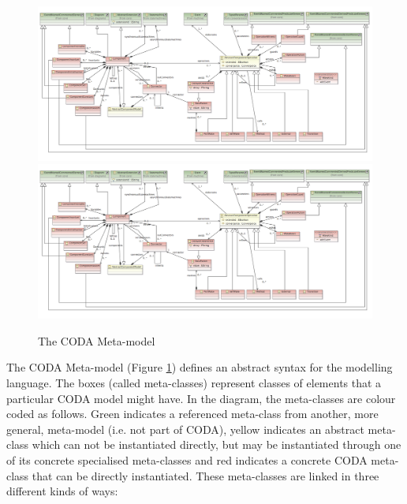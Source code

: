 \begin{figure}[!htbp]
  \centering
  \ifplastex
  \includegraphics[width=1024]{figures/image1.png}
  \else
  \includegraphics[width=1.0\textwidth]{figures/image1.png}
  \fi
  \caption{The CODA Meta-model}
  \label{fig:TheCodaMetamodel}
\end{figure}



The CODA Meta-model (Figure \ref{fig:TheCodaMetamodel}) defines an abstract syntax for the modelling language.
The boxes (called meta-classes) represent classes of elements that a particular CODA model might have.
In the diagram, the meta-classes are colour coded as follows.
Green indicates a referenced meta-class from another, more general, meta-model (i.e. not part of CODA), 
yellow indicates an abstract meta-class which can not be instantiated directly, but may be instantiated through one of its concrete specialised meta-classes and 
red indicates a concrete CODA meta-class that can be directly instantiated. 
These meta-classes are linked in three different kinds of ways:

